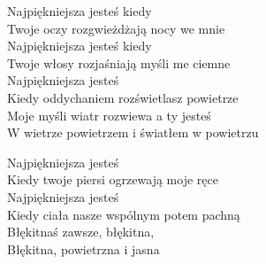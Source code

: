 
\begin{text}
    Najpiękniejsza jesteś kiedy\\
    Twoje oczy rozgwieżdżają nocy we mnie\\
    Najpiękniejsza jesteś kiedy\\
    Twoje włosy rozjaśniają myśli me ciemne\\
    Najpiękniejsza jesteś\\
    Kiedy oddychaniem rozświetlasz powietrze\\
    Moje myśli wiatr rozwiewa a ty jesteś\\
    W wietrze powietrzem i światłem w powietrzu

    Najpiękniejsza jesteś\\
    Kiedy twoje piersi ogrzewają moje ręce\\
    Najpiękniejsza jesteś\\
    Kiedy ciała nasze wspólnym potem pachną\\
    Błękitnaś zawsze, błękitna,\\
    Błękitna, powietrzna i jasna
\end{text}
\begin{chord}

\end{chord}